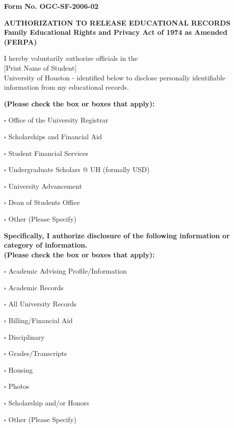 \documentclass[12pt]{article}
\begin{document}
\noindent \textbf{Form No. OGC-SF-2006-02} %

\begin{center}
    {\fontsize{11pt}{13pt} \selectfont \textbf{AUTHORIZATION TO RELEASE EDUCATIONAL RECORDS}}\\
    {\fontsize{11pt}{13pt} \selectfont \textbf{Family Educational Rights and Privacy Act of 1974 as Amended (FERPA)}}
\end{center}

I \underline{\hspace{9cm}} hereby voluntarily authorize officials in the\\
\hspace{2cm} [Print Name of Student] \\

University of Houston - \underline{\hspace{7cm}} identified below to disclose personally identifiable information from my educational records.

\textbf{(Please check the box or boxes that apply):}
\begin{list}{}{\leftmargin=0pt \itemindent=0pt \setlength{\itemsep}{0pt}}
    \item $\square$ Office of the University Registrar
    \item $\square$ Scholarships and Financial Aid
    \item $\square$ Student Financial Services
    \item $\square$ Undergraduate Scholars @ UH (formally USD)
    \item $\square$ University Advancement
    \item $\square$ Dean of Students Office
    \item $\square$ Other (Please Specify) \underline{\hspace{5cm}}
\end{list}

\textbf{Specifically, I authorize disclosure of the following information or category of information.}\\
\textbf{(Please check the box or boxes that apply):}
\begin{list}{}{\leftmargin=0pt \itemindent=0pt \setlength{\itemsep}{0pt}}
    \item $\square$ Academic Advising Profile/Information
    \item $\square$ Academic Records
    \item $\square$ All University Records
    \item $\square$ Billing/Financial Aid
    \item $\square$ Disciplinary
    \item $\square$ Grades/Transcripts
    \item $\square$ Housing
    \item $\square$ Photos
    \item $\square$ Scholarship and/or Honors
    \item $\square$ Other (Please Specify) \underline{\hspace{5cm}}
\end{list}
\end{document}
